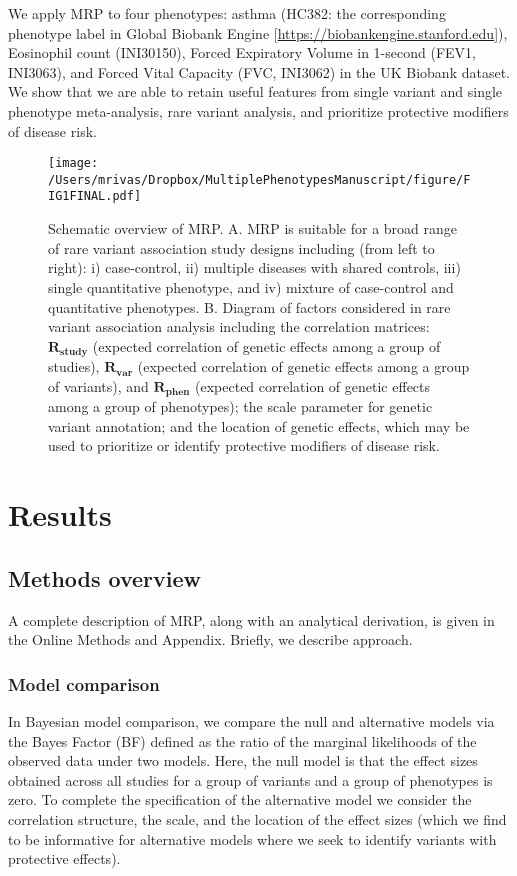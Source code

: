 \documentclass{nature}
\begin{document}
We apply MRP to four phenotypes: asthma (HC382: the corresponding phenotype label in Global Biobank Engine [\url{https://biobankengine.stanford.edu}]), Eosinophil count (INI30150), Forced Expiratory Volume in 1-second (FEV1, INI3063), and Forced Vital Capacity (FVC, INI3062) in the UK Biobank dataset. We show that we are able to retain useful features from single variant and single phenotype meta-analysis, rare variant analysis, and prioritize protective modifiers of disease risk. 

\begin{figure}
  \centering
  \texttt{[image: /Users/mrivas/Dropbox/MultiplePhenotypesManuscript/figure/FIG1FINAL.pdf]}
  \caption{Schematic overview of MRP. A. MRP is suitable for a broad range of rare variant association study designs including (from left to right): i) case-control, ii) multiple diseases with shared controls, iii) single quantitative phenotype, and iv) mixture of case-control and quantitative phenotypes. B. Diagram of factors considered in rare variant association analysis including the correlation matrices: $\mathbf{R_{\textrm{study}}}$  (expected correlation of genetic effects among a group of studies), $\mathbf{R_{\textrm{var}}}$ (expected correlation of genetic effects among a group of variants), and $\mathbf{R_{\textrm{phen}}}$ (expected correlation of genetic effects among a group of phenotypes); the scale parameter for genetic variant annotation; and the location of genetic effects, which may be used to prioritize or identify protective modifiers of disease risk.}
  \label{Fig1}
  \end{figure}
  

\section{Results}

\subsection{Methods overview}
A complete description of MRP, along with an analytical derivation, is given in the Online Methods and Appendix. Briefly, we describe approach.

\subsubsection{Model comparison}
In Bayesian model comparison, we compare the null and alternative models via the Bayes Factor (BF) defined as the ratio of the marginal likelihoods of the observed data under two models. Here, the null model is that the effect sizes obtained across all studies for a group of variants and a group of phenotypes is zero. To complete the specification of the alternative model we consider the correlation structure, the scale, and the location of the effect sizes (which we find to be informative for alternative models where we seek to identify variants with protective effects). 
\end{document}
